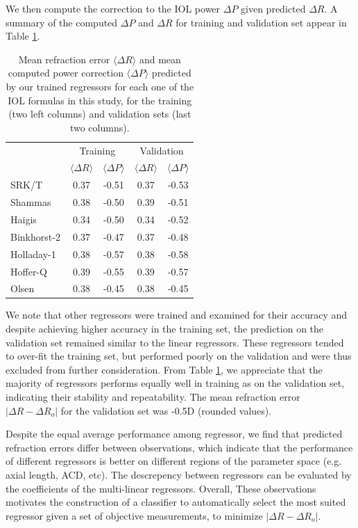 \documentclass[article,twocolumn,preprint,10pt]{paper}%
\renewcommand{\(}{\left(}
\renewcommand{\)}{\right)}
\renewcommand{\[}{\left[}
\renewcommand{\]}{\right]}
\newcommand{\1}{\mbox{\boldmath$1$}}
\begin{document}
We then compute the correction to the IOL power $\Delta P$ given predicted $\Delta R$. A summary of the computed $\Delta P$ and $\Delta R$ for training and validation set appear in Table \ref{table:refractionAndPowercorrectionResults}.
\begin{table}
	\begin{tabular}{l|c|c|c|c|}
		  &\multicolumn{2}{c}{Training} &\multicolumn{2}{c}{Validation}\\		  
		 &  $\langle \Delta R\rangle $ & $\langle \Delta P\rangle $  & $\langle \Delta R\rangle$ & $\langle\Delta P\rangle $ \\
		 \hline 
		 SRK/T         & 0.37 & -0.51 & 0.37   & -0.53\\
		 Shammas   & 0.38 & -0.50 & 0.39  & -0.51\\
		 Haigis        & 0.34 & -0.50 & 0.34  & -0.52\\
		 Binkhorst-2 &0.37 & -0.47 & 0.37  & -0.48\\
		 Holladay-1 & 0.38 & -0.57 & 0.38  & -0.58\\
		 Hoffer-Q   & 0.39 & -0.55 &  0.39 & -0.57\\
		 Olsen        & 0.38 & -0.45 &  0.38  & -0.45
	\end{tabular}
\caption{Mean refraction error $\langle \Delta R\rangle$ and mean computed power correction $\langle \Delta P\rangle$ predicted by our trained regressors for each one of the IOL formulas in this study, for the training (two left columns) and validation sets (last two columns).}
\label{table:refractionAndPowercorrectionResults}
\end{table}
We note that other regressors were trained and examined for their accuracy and despite achieving higher accuracy in the training set, the prediction on the validation set remained similar to the linear regressors. These regressors tended to over-fit the training set, but performed poorly on the validation and were thus excluded from further consideration. 
From Table \ref{table:refractionAndPowercorrectionResults}, we appreciate that the majority of regressors performs equally well in training as on the validation set, indicating their stability and repeatability. The mean refraction error $|\Delta R -\Delta R_o|$ for the validation set was -0.5D (rounded values).

Despite the equal average performance among regressor, we find that predicted refraction errors differ between observations, which indicate that the performance of different regressors is better on different regions of the parameter space (e.g. axial length, ACD, etc). The descrepency between regressors can be evaluated by the coefficients of the multi-linear regressors. Overall, These observations motivates the construction of a classifier to automatically select the most suited regressor given a set of objective measurements, to minimize $|\Delta R-\Delta R_o|$. 
\end{document}
